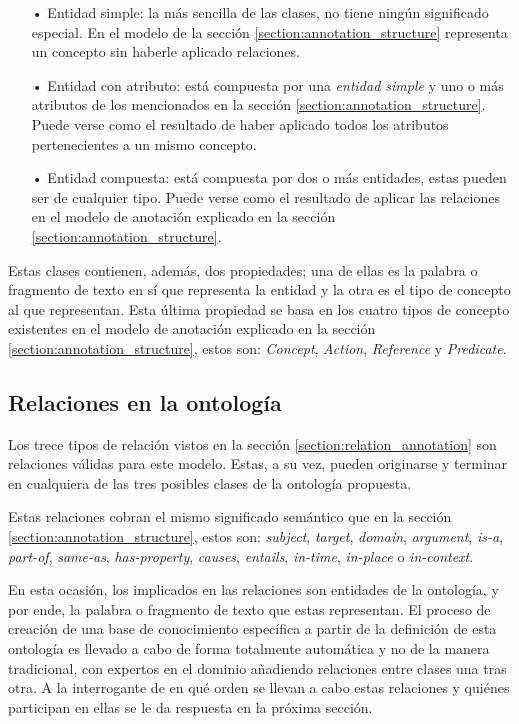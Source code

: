 \begin{itemize}
	\item[•] Entidad simple: la más sencilla de las clases, no tiene ningún significado especial. En el modelo de la sección \ref{section:annotation_structure} representa un concepto sin haberle aplicado relaciones.
	\item[•] Entidad con atributo: está compuesta por una \textit{entidad simple} y uno o más atributos de los mencionados en la sección \ref{section:annotation_structure}. Puede verse como el resultado de haber aplicado todos los atributos pertenecientes a un mismo concepto.
	\item[•] Entidad compuesta: está compuesta por dos o más entidades, estas pueden ser de cualquier tipo. Puede verse como el resultado de aplicar las relaciones en el modelo de anotación explicado en la sección \ref{section:annotation_structure}.
\end{itemize}

Estas clases contienen, además, dos propiedades; una de ellas es la palabra o fragmento de texto en sí que representa la entidad y la otra es el tipo de concepto al que representan. Esta última propiedad se basa en los cuatro tipos de concepto existentes en el modelo de anotación explicado en la sección \ref{section:annotation_structure}, estos son: \textit{Concept}, \textit{Action}, \textit{Reference} y \textit{Predicate}.

\subsection{Relaciones en la ontología}
Los trece tipos de relación vistos en la sección \ref{section:relation_annotation} son relaciones válidas para este modelo. Estas, a su vez, pueden originarse y terminar en cualquiera de las tres posibles clases de la ontología propuesta.

Estas relaciones cobran el mismo significado semántico que en la sección \ref{section:annotation_structure}, estos son: {\it subject}, {\it target}, {\it domain}, {\it argument}, {\it is-a}, {\it part-of}, {\it same-as}, {\it has-property}, {\it causes}, {\it entails}, {\it in-time}, {\it in-place} o {\it in-context}.

En esta ocasión, los implicados en las relaciones son entidades de la ontología, y por ende, la palabra o fragmento de texto que estas representan. El proceso de creación de una base de conocimiento específica a partir de la definición de esta ontología es llevado a cabo de forma totalmente automática y no de la manera tradicional, con expertos en el dominio añadiendo relaciones entre clases una tras otra. A la interrogante de en qué orden se llevan a cabo estas relaciones y quiénes participan en ellas se le da respuesta en la próxima sección.

